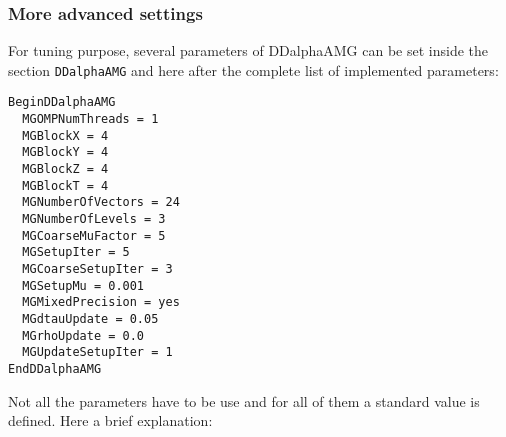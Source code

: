 \subsubsection{More advanced settings}
For tuning purpose, several parameters of DDalphaAMG can be set inside the section \texttt{DDalphaAMG} and here after the complete list of implemented parameters: 
\begin{Verbatim}[fontsize=\small]
BeginDDalphaAMG
  MGOMPNumThreads = 1
  MGBlockX = 4
  MGBlockY = 4
  MGBlockZ = 4
  MGBlockT = 4
  MGNumberOfVectors = 24
  MGNumberOfLevels = 3
  MGCoarseMuFactor = 5
  MGSetupIter = 5
  MGCoarseSetupIter = 3
  MGSetupMu = 0.001
  MGMixedPrecision = yes
  MGdtauUpdate = 0.05
  MGrhoUpdate = 0.0
  MGUpdateSetupIter = 1
EndDDalphaAMG
\end{Verbatim}
Not all the parameters have to be use and for all of them a standard value is defined. Here a brief explanation:
